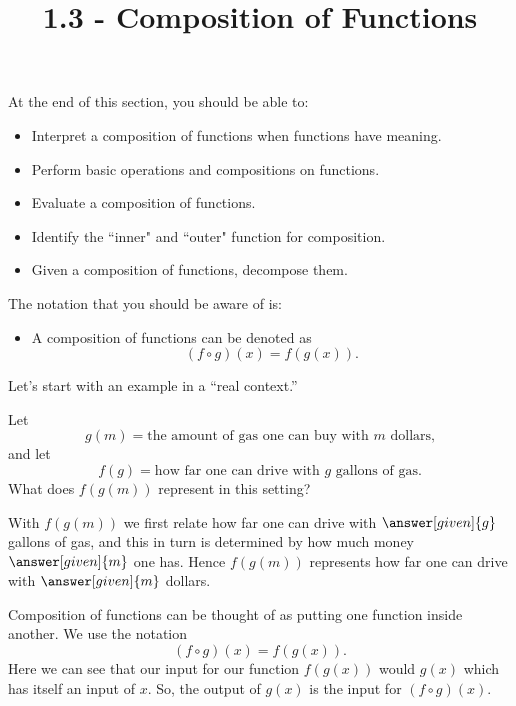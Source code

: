 \documentclass{ximera}
\title{1.3 - Composition of Functions}
\begin{document}
\begin{abstract} \end{abstract}
\maketitle

At the end of this section, you should be able to:
\begin{itemize}
    \item Interpret a composition of functions when functions have meaning.
    \item Perform basic operations and compositions on functions.
      \item Evaluate a composition of functions.
      \item Identify the ``inner" and ``outer" function for composition.
    \item Given a composition of functions, decompose them.
    
\end{itemize}

The notation that you should be aware of is:
\begin{itemize}
    \item A composition of functions can be denoted as $$(f\circ g)(x)=f(g(x)).$$
\end{itemize}
Let's start with an example in a
``real context.''

\begin{example}
  Let
  \[
  g(m) = \text{the amount of gas one can buy with $m$ dollars,}
  \]
  and let
  \[
  f(g) = \text{how far one can drive with $g$ gallons of gas.}
  \]
  What does $f(g(m))$ represent in this setting?
  \begin{explanation}
    With $f(g(m))$ we first relate how far one can drive with
    $\answer[given]{g}$ gallons of gas, and this in turn is determined
    by how much money $\answer[given]{m}$ one has. Hence $f(g(m))$ represents how far
    one can drive with $\answer[given]{m}$ dollars.
  \end{explanation}
\end{example}

Composition of functions can be thought of as putting one function
inside another.  We use the notation
\[
(f\circ g)(x) = f(g(x)).
\]
Here we can see that our input for our function $f(g(x))$ would $g(x)$ which has itself an input of $x$. So, the output of $g(x)$ is the input for $(f\circ g)(x)$.
\end{document}
